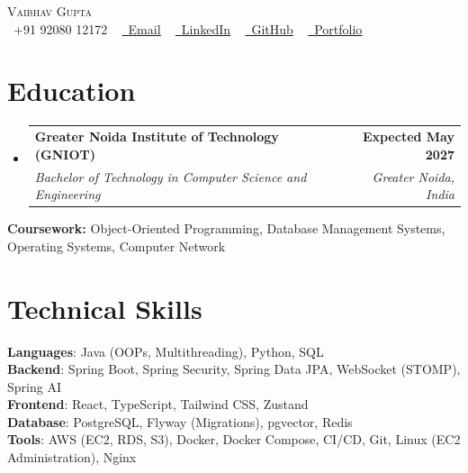 \documentclass[letterpaper,10pt]{article}
\makeatletter
\newcommand{\resumeSubheading}[4]{
  \vspace{-2pt}\item
    \begin{tabular*}{1.0\textwidth}[t]{l@{\extracolsep{\fill}}r}
      \textbf{#1} & \textbf{\small #2} \\
      \textit{\small#3} & \textit{\small #4} \\
    \end{tabular*}\vspace{-7pt}
}
\newcommand{\resumeSubHeadingListStart}{\begin{itemize}[leftmargin=0.0in, label={}]}
\newcommand{\resumeSubHeadingListEnd}{\end{itemize}}
\makeatother
\begin{document}

\begin{center}
    {\Huge \scshape Vaibhav Gupta} \\ \vspace{1pt}
    \small \raisebox{-0.1\height}\faPhone\ +91 92080 12172 ~
    \href{mailto:vaibhv19.business@gmail.com}{\raisebox{-0.2\height}\faEnvelope\ \underline{Email}} ~
    \href{https://linkedin.com/in/vaibhv19}{\raisebox{-0.2\height}\faLinkedin\ \underline{LinkedIn}} ~
    \href{https://github.com/vaibhv19}{\raisebox{-0.2\height}\faGithub\ \underline{GitHub}} ~
    \href{https://vaibhv19.dev}{\raisebox{-0.2\height}\faGlobe\ \underline{Portfolio}}
    \vspace{-8pt}
\end{center}

\section{Education}
  \resumeSubHeadingListStart
    \resumeSubheading
      {Greater Noida Institute of Technology (GNIOT)}{Expected May 2027}
      {Bachelor of Technology in Computer Science and Engineering}{Greater Noida, India}
  \resumeSubHeadingListEnd
  \vspace{-4pt}
  \begin{itemize}[leftmargin=0in, label={}]
    \small{\item{\textbf{Coursework:} Object-Oriented Programming, Database Management Systems, Operating Systems, Computer Network}}
    \vspace{-10pt}
\end{itemize}

\section{Technical Skills}
 \begin{itemize}[leftmargin=0in, label={}]
    \small{\item{
     \textbf{Languages}{: Java (OOPs, Multithreading), Python, SQL} \\
     \textbf{Backend}{: Spring Boot, Spring Security, Spring Data JPA, WebSocket (STOMP), Spring AI} \\
     \textbf{Frontend}{: React, TypeScript, Tailwind CSS, Zustand} \\
     \textbf{Database}{: PostgreSQL, Flyway (Migrations), pgvector, Redis} \\
     \textbf{Tools}{: AWS (EC2, RDS, S3), Docker, Docker Compose, CI/CD, Git, Linux (EC2 Administration), Nginx} \\
    }}
 \end{itemize}
 \vspace{-12pt}
\end{document}
